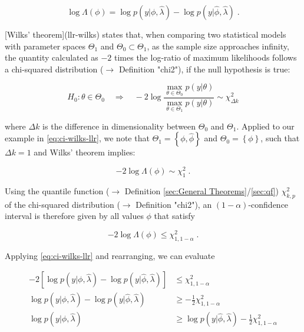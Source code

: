 \documentclass[a4paper,12pt,twoside]{book}
\begin{document}
\begin{equation} \label{eq:ci-wilks-llr}
\log \Lambda(\phi) = \log p(y|\phi,\hat{\lambda}) - \log p(y|\hat{\phi},\hat{\lambda}) \; .
\end{equation}

[Wilks' theorem](llr-wilks) states that, when comparing two statistical models with parameter spaces $\Theta_1$ and $\Theta_0 \subset \Theta_1$, as the sample size approaches infinity, the quantity calculated as $-2$ times the log-ratio of maximum likelihoods follows a chi-squared distribution ($\rightarrow$ Definition "chi2"), if the null hypothesis is true:

\begin{equation} \label{eq:ci-wilks-wilks}
H_0: \theta \in \Theta_0 \quad \Rightarrow \quad -2 \log \frac{\operatorname*{max}_{\theta \in \Theta_0} p(y|\theta)}{\operatorname*{max}_{\theta \in \Theta_1} p(y|\theta)} \sim \chi^2_{\Delta k}
\end{equation}

where $\Delta k$ is the difference in dimensionality between $\Theta_0$ and $\Theta_1$. Applied to our example in \eqref{eq:ci-wilks-llr}, we note that $\Theta_1 = \left\lbrace \phi, \hat{\phi} \right\rbrace$ and $\Theta_0 = \left\lbrace \phi \right\rbrace$, such that $\Delta k = 1$ and Wilks' theorem implies:

\begin{equation} \label{eq:ci-wilks-llr-wilks}
-2 \log \Lambda(\phi) \sim  \chi^2_1 \; .
\end{equation}

Using the quantile function ($\rightarrow$ Definition \ref{sec:General Theorems}/\ref{sec:qf}) $\chi^2_{k,p}$ of the chi-squared distribution ($\rightarrow$ Definition "chi2"), an $(1-\alpha)$-confidence interval is therefore given by all values $\phi$ that satisfy

\begin{equation} \label{eq:ci-wilks-llr-chi2}
-2 \log \Lambda(\phi) \leq \chi^2_{1,1-\alpha} \; .
\end{equation}

Applying \eqref{eq:ci-wilks-llr} and rearranging, we can evaluate

\begin{equation} \label{eq:ci-wilks-llr-chi2-dev}
\begin{split}
-2 \left[ \log p(y|\phi,\hat{\lambda}) - \log p(y|\hat{\phi},\hat{\lambda}) \right] &\leq \chi^2_{1,1-\alpha} \\
\log p(y|\phi,\hat{\lambda}) - \log p(y|\hat{\phi},\hat{\lambda}) &\geq -\frac{1}{2} \chi^2_{1,1-\alpha} \\
\log p(y|\phi,\hat{\lambda}) &\geq \log p(y|\hat{\phi},\hat{\lambda}) - \frac{1}{2} \chi^2_{1,1-\alpha}
\end{split}
\end{equation}
\end{document}
